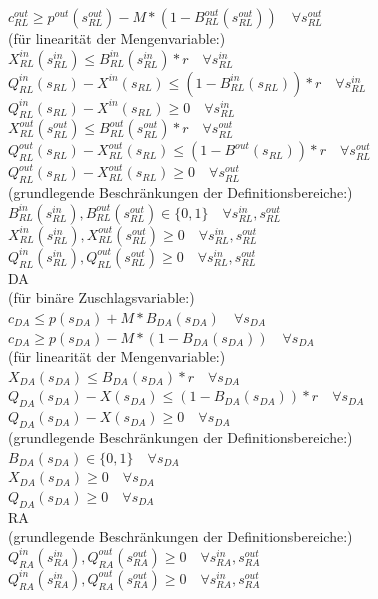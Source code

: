         $c^{out}_{RL} \geq p^{out}(s^{out}_{RL}) - M * (1 - B^{out}_{RL}(s^{out}_{RL}))\quad\forall s^{out}_{RL}$  \\
        (für linearität der Mengenvariable:)\\
        $X^{in}_{RL}(s^{in}_{RL}) \leq B^{in}_{RL}(s^{in}_{RL}) * r \quad\forall s^{in}_{RL}$\\
        $Q^{in}_{RL}(s_{RL}) - X^{in}(s_{RL}) \leq (1 - B^{in}_{RL}(s_{RL})) * r \quad\forall s^{in}_{RL}$\\
        $Q^{in}_{RL}(s_{RL}) - X^{in}(s_{RL}) \geq 0 \quad\forall s^{in}_{RL}$\\
        $X^{out}_{RL}(s^{out}_{RL}) \leq B^{out}_{RL}(s^{out}_{RL}) * r \quad\forall s^{out}_{RL}$\\
        $Q^{out}_{RL}(s_{RL}) - X^{out}_{RL}(s_{RL}) \leq (1 - B^{out}(s_{RL})) * r \quad\forall s^{out}_{RL}$\\
        $Q^{out}_{RL}(s_{RL}) - X^{out}_{RL}(s_{RL}) \geq 0\quad\forall s^{out}_{RL} $\\
        (grundlegende Beschränkungen der Definitionsbereiche:)\\
        $B^{in}_{RL}(s^{in}_{RL}),B^{out}_{RL}(s^{out}_{RL}) \in \{0,1\}\quad\forall s^{in}_{RL},s^{out}_{RL} $\\
        $X^{in}_{RL}(s^{in}_{RL}),X^{out}_{RL}(s^{out}_{RL}) \geq 0 \quad\forall s^{in}_{RL},s^{out}_{RL} $\\
        $Q^{in}_{RL}(s^{in}_{RL}),Q^{out}_{RL}(s^{out}_{RL}) \geq 0\quad\forall  s^{in}_{RL},s^{out}_{RL} $\\
DA\\
        (für binäre Zuschlagsvariable:)\\
        $c_{DA} \leq p(s_{DA}) + M * B_{DA}(s_{DA})\quad\forall s_{DA} $ \\
        $c_{DA} \geq p(s_{DA}) - M * (1 - B_{DA}(s_{DA}))\quad\forall s_{DA} $ \\
        (für linearität der Mengenvariable:)\\
        $X_{DA}(s_{DA}) \leq B_{DA}(s_{DA}) * r \quad\forall s_{DA}$\\
        $Q_{DA}(s_{DA}) - X(s_{DA}) \leq (1 - B_{DA}(s_{DA})) * r \quad\forall s_{DA}$\\
        $Q_{DA}(s_{DA}) - X(s_{DA}) \geq 0 \quad\forall s_{DA}$\\
        (grundlegende Beschränkungen der Definitionsbereiche:)\\
        $B_{DA}(s_{DA})\in \{0,1\}\quad\forall s_{DA} $\\
        $X_{DA}(s_{DA}) \geq 0 \quad\forall s_{DA} $\\
        $Q_{DA}(s_{DA}) \geq 0\quad\forall  s_{DA} $\\
RA\\
	(grundlegende Beschränkungen der Definitionsbereiche:)
	$Q^{in}_{RA}(s^{in}_{RA}),Q^{out}_{RA}(s^{out}_{RA}) \geq 0 \quad\forall s^{in}_{RA},s^{out}_{RA} $\\
	$Q^{in}_{RA}(s^{in}_{RA}),Q^{out}_{RA}(s^{out}_{RA}) \geq 0\quad\forall  s^{in}_{RA},s^{out}_{RA} $\\



